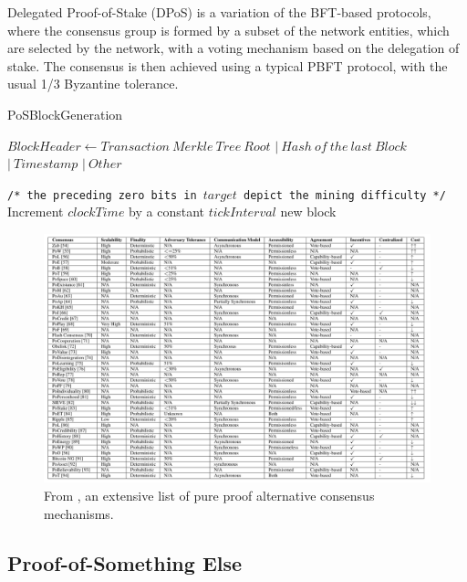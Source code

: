 \documentclass[journal]{IEEEtran}
\newcommand{\LineComment}[1]{\State \texttt{/* #1 */}}
\begin{document}
Delegated Proof-of-Stake (DPoS) is a variation of the BFT-based protocols,
where the consensus group is formed by a subset of the network entities,
which are selected by the network, with a voting mechanism based on the
delegation of stake. The consensus is then achieved using a typical 
PBFT protocol, with the usual 1/3 Byzantine tolerance.

\begin{algorithm}
  \caption[short]{PoSBlockGeneration}\label{alg:PoSBlockGeneration}
  \begin{algorithmic}[1]
    \Function {}{}
      \State $Block Header \gets Transaction \ Merkle \ Tree \ Root$
      \Indent
        \State $| \ Hash \ of \ the \ last \ Block$
        \State $| \ Timestamp$
        \State $| \ Other$
      \EndIndent
      
      \LineComment{the preceding zero bits in $target$ depict the mining difficulty}
      \State Increment $clockTime$ by a constant $tickInterval$
      \EndWhile
      \State \Return new block
    \EndFunction
  \end{algorithmic}
\end{algorithm}

\begin{figure}[h]
  \centering
  \captionsetup{justification=centering}
  \includegraphics[width=\textwidth]{proof-alternative-consensus}
  \caption{From \cite{9376868}, an extensive list of pure proof alternative consensus mechanisms.}
  \label{fig:proof-alternative-consensus}
\end{figure}

\subsection{Proof-of-Something Else}
\end{document}
